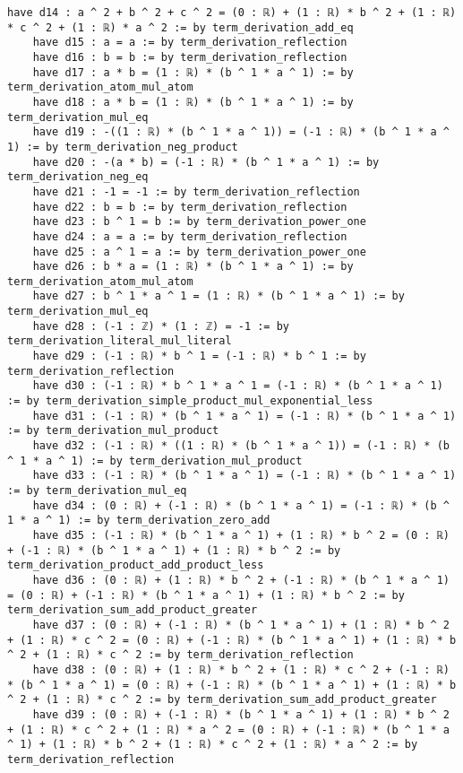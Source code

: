 \documentclass{article}
\begin{document}
\begin{tcolorbox}[colback=white!10, width=\linewidth]
\begin{lstlisting}[language=Lean4]
    have d14 : a ^ 2 + b ^ 2 + c ^ 2 = (0 : ℝ) + (1 : ℝ) * b ^ 2 + (1 : ℝ) * c ^ 2 + (1 : ℝ) * a ^ 2 := by term_derivation_add_eq
    have d15 : a = a := by term_derivation_reflection
    have d16 : b = b := by term_derivation_reflection
    have d17 : a * b = (1 : ℝ) * (b ^ 1 * a ^ 1) := by term_derivation_atom_mul_atom
    have d18 : a * b = (1 : ℝ) * (b ^ 1 * a ^ 1) := by term_derivation_mul_eq
    have d19 : -((1 : ℝ) * (b ^ 1 * a ^ 1)) = (-1 : ℝ) * (b ^ 1 * a ^ 1) := by term_derivation_neg_product
    have d20 : -(a * b) = (-1 : ℝ) * (b ^ 1 * a ^ 1) := by term_derivation_neg_eq
    have d21 : -1 = -1 := by term_derivation_reflection
    have d22 : b = b := by term_derivation_reflection
    have d23 : b ^ 1 = b := by term_derivation_power_one
    have d24 : a = a := by term_derivation_reflection
    have d25 : a ^ 1 = a := by term_derivation_power_one
    have d26 : b * a = (1 : ℝ) * (b ^ 1 * a ^ 1) := by term_derivation_atom_mul_atom
    have d27 : b ^ 1 * a ^ 1 = (1 : ℝ) * (b ^ 1 * a ^ 1) := by term_derivation_mul_eq
    have d28 : (-1 : ℤ) * (1 : ℤ) = -1 := by term_derivation_literal_mul_literal
    have d29 : (-1 : ℝ) * b ^ 1 = (-1 : ℝ) * b ^ 1 := by term_derivation_reflection
    have d30 : (-1 : ℝ) * b ^ 1 * a ^ 1 = (-1 : ℝ) * (b ^ 1 * a ^ 1) := by term_derivation_simple_product_mul_exponential_less
    have d31 : (-1 : ℝ) * (b ^ 1 * a ^ 1) = (-1 : ℝ) * (b ^ 1 * a ^ 1) := by term_derivation_mul_product
    have d32 : (-1 : ℝ) * ((1 : ℝ) * (b ^ 1 * a ^ 1)) = (-1 : ℝ) * (b ^ 1 * a ^ 1) := by term_derivation_mul_product
    have d33 : (-1 : ℝ) * (b ^ 1 * a ^ 1) = (-1 : ℝ) * (b ^ 1 * a ^ 1) := by term_derivation_mul_eq
    have d34 : (0 : ℝ) + (-1 : ℝ) * (b ^ 1 * a ^ 1) = (-1 : ℝ) * (b ^ 1 * a ^ 1) := by term_derivation_zero_add
    have d35 : (-1 : ℝ) * (b ^ 1 * a ^ 1) + (1 : ℝ) * b ^ 2 = (0 : ℝ) + (-1 : ℝ) * (b ^ 1 * a ^ 1) + (1 : ℝ) * b ^ 2 := by term_derivation_product_add_product_less
    have d36 : (0 : ℝ) + (1 : ℝ) * b ^ 2 + (-1 : ℝ) * (b ^ 1 * a ^ 1) = (0 : ℝ) + (-1 : ℝ) * (b ^ 1 * a ^ 1) + (1 : ℝ) * b ^ 2 := by term_derivation_sum_add_product_greater
    have d37 : (0 : ℝ) + (-1 : ℝ) * (b ^ 1 * a ^ 1) + (1 : ℝ) * b ^ 2 + (1 : ℝ) * c ^ 2 = (0 : ℝ) + (-1 : ℝ) * (b ^ 1 * a ^ 1) + (1 : ℝ) * b ^ 2 + (1 : ℝ) * c ^ 2 := by term_derivation_reflection
    have d38 : (0 : ℝ) + (1 : ℝ) * b ^ 2 + (1 : ℝ) * c ^ 2 + (-1 : ℝ) * (b ^ 1 * a ^ 1) = (0 : ℝ) + (-1 : ℝ) * (b ^ 1 * a ^ 1) + (1 : ℝ) * b ^ 2 + (1 : ℝ) * c ^ 2 := by term_derivation_sum_add_product_greater
    have d39 : (0 : ℝ) + (-1 : ℝ) * (b ^ 1 * a ^ 1) + (1 : ℝ) * b ^ 2 + (1 : ℝ) * c ^ 2 + (1 : ℝ) * a ^ 2 = (0 : ℝ) + (-1 : ℝ) * (b ^ 1 * a ^ 1) + (1 : ℝ) * b ^ 2 + (1 : ℝ) * c ^ 2 + (1 : ℝ) * a ^ 2 := by term_derivation_reflection

\end{lstlisting}
\end{tcolorbox}
\end{document}
